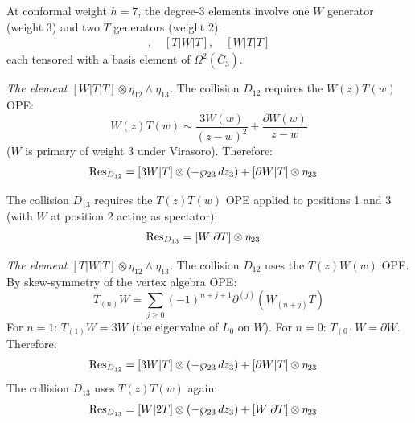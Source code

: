 \begin{computation}
\label{comp:w3-deg3-mixed}

At conformal weight $h = 7$, the degree-3 elements involve
one $W$ generator (weight 3) and two $T$ generators (weight 2):
\begin{align*}
[T|T|W],\quad [T|W|T],\quad [W|T|T]
\end{align*}
each tensored with a basis element of $\Omega^2(\overline{C}_3)$.

\emph{The element $[W|T|T] \otimes \eta_{12} \wedge \eta_{13}$.}
The collision $D_{12}$ requires the $W(z)T(w)$ OPE:
\[
W(z)T(w) \sim \frac{3W(w)}{(z-w)^2} + \frac{\partial W(w)}{z-w}
\]
($W$ is primary of weight 3 under Virasoro).  Therefore:
\begin{align*}
\operatorname{Res}_{D_{12}} &= [3W|T] \otimes (-\wp_{23}\,dz_3)
+ [\partial W|T] \otimes \eta_{23}
\end{align*}

The collision $D_{13}$ requires the $T(z)T(w)$ OPE applied to
positions 1 and 3 (with $W$ at position 2 acting as spectator):
\begin{align*}
\operatorname{Res}_{D_{13}} &= [W|\partial T] \otimes \eta_{23}
\end{align*}

\emph{The element $[T|W|T] \otimes \eta_{12} \wedge \eta_{13}$.}
The collision $D_{12}$ uses the $T(z)W(w)$ OPE.  By
skew-symmetry of the vertex algebra OPE:
\[
T_{(n)}W = \sum_{j \geq 0} (-1)^{n+j+1}\partial^{(j)}(W_{(n+j)}T)
\]
For $n = 1$: $T_{(1)}W = 3W$ (the eigenvalue of $L_0$ on $W$).
For $n = 0$: $T_{(0)}W = \partial W$.  Therefore:
\begin{align*}
\operatorname{Res}_{D_{12}} &= [3W|T] \otimes (-\wp_{23}\,dz_3)
+ [\partial W|T] \otimes \eta_{23}
\end{align*}
The collision $D_{13}$ uses $T(z)T(w)$ again:
\begin{align*}
\operatorname{Res}_{D_{13}} &= [W|2T] \otimes (-\wp_{23}\,dz_3)
+ [W|\partial T] \otimes \eta_{23}
\end{align*}
\end{computation}

